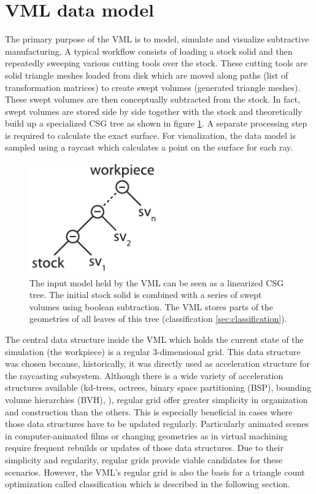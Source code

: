 \section{VML data model}
\label{sec:vml_data_model}

The primary purpose of the VML is to model, simulate and visualize subtractive manufacturing.
A typical workflow consists of loading a stock solid and then repeatedly sweeping various cutting tools over the stock.
These cutting tools are solid triangle meshes loaded from disk which are moved along paths (list of transformation matrices) to create swept volumes (generated triangle meshes).
These swept volumes are then conceptually subtracted from the stock.
In fact, swept volumes are stored side by side together with the stock and theoretically build up a specialized CSG tree as shown in figure \ref{fig:vml_csg}.
A separate processing step is required to calculate the exact surface.
For visualization, the data model is sampled using a raycast which calculates a point on the surface for each ray.

\begin{figure}
	\centering
	\includegraphics[width=0.5\textwidth]{images/vml_csg}
	\caption{
		The input model held by the VML can be seen as a linearized CSG tree.
		The initial stock solid is combined with a series of swept volumes using boolean subtraction.
		The VML stores parts of the geometries of all leaves of this tree (\cf classification \ref{sec:classification}).
	}
	\label{fig:vml_csg}
\end{figure}


The central data structure inside the VML which holds the current state of the simulation (\ie the workpiece) is a regular 3-dimensional grid.
This data structure was chosen because, historically, it was directly used as acceleration structure for the raycasting subsystem.
Although there is a wide variety of acceleration structures available (\eg kd-trees, octrees, binary space partitioning (BSP), bounding volume hierarchies (BVH), \etc), regular grid offer greater simplicity in organization and construction than the others.
This is especially beneficial in cases where those data structures have to be updated regularly.
Particularly animated scenes in computer-animated films or changing geometries as in virtual machining require frequent rebuilds or updates of those data structures.
Due to their simplicity and regularity, regular grids provide viable candidates for these scenarios.
However, the VML's regular grid is also the basis for a triangle count optimization called classification which is described in the following section.


